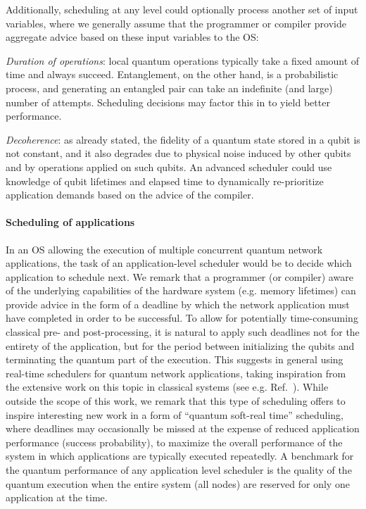 Additionally, scheduling at any level could optionally process another set of input variables, where
we generally assume that the programmer or compiler provide aggregate advice based on these input
variables to the OS:
%
\begin{enumerate*}[label=(\arabic*)]
    \item \emph{Duration of operations}: local quantum operations typically take a fixed amount of
          time and always succeed. Entanglement, on the other hand, is a probabilistic process, and
          generating an entangled pair can take an indefinite (and large) number of attempts.
          Scheduling decisions may factor this in to yield better performance.
    \item \emph{Decoherence}: as already stated, the fidelity of a quantum state stored in a qubit
          is not constant, and it also degrades due to physical noise induced by other qubits and by
          operations applied on such qubits. An advanced scheduler could use knowledge of qubit
          lifetimes and elapsed time to dynamically re-prioritize application demands based on the
          advice of the compiler.
\end{enumerate*}

\paragraph{Scheduling of applications}

In an OS allowing the execution of multiple concurrent quantum network applications, the task of an
application-level scheduler would be to decide which application to schedule next. We remark that a
programmer (or compiler) aware of the underlying capabilities of the hardware system (e.g. memory
lifetimes) can provide advice in the form of a deadline by which the network application must have
completed in order to be successful. To allow for potentially time-consuming classical pre- and
post-processing, it is natural to apply such deadlines not for the entirety of the application, but
for the period between initializing the qubits and terminating the quantum part of the execution.
This suggests in general using real-time schedulers for quantum network applications, taking
inspiration from the extensive work on this topic in classical systems (see e.g.
Ref.~\cite{liu_1973_scheduling}). While outside the scope of this work, we remark that this type of
scheduling offers to inspire interesting new work in a form of ``quantum soft-real time''
scheduling, where deadlines may occasionally be missed at the expense of reduced application
performance (success probability), to maximize the overall performance of the system in which
applications are typically executed repeatedly. A benchmark for the quantum performance of any
application level scheduler is the quality of the quantum execution when the entire system (all
nodes) are reserved for only one application at the time.

